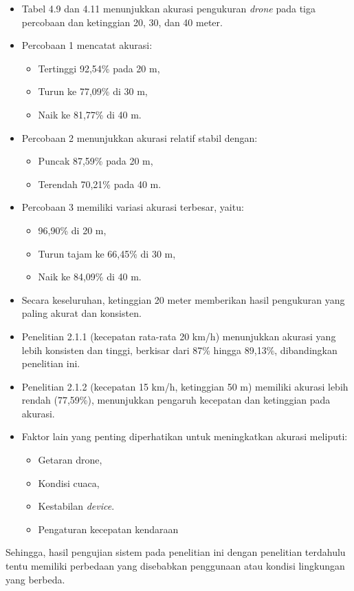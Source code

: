 \begin{itemize}[nolistsep]
    \item Tabel 4.9 dan 4.11 menunjukkan akurasi pengukuran \emph{drone} pada tiga percobaan dan ketinggian 20, 30, dan 40 meter.
    \item Percobaan 1 mencatat akurasi:
    \begin{itemize}[nolistsep]
        \item Tertinggi 92,54\% pada 20 m,
        \item Turun ke 77,09\% di 30 m,
        \item Naik ke 81,77\% di 40 m.
    \end{itemize}
    \item Percobaan 2 menunjukkan akurasi relatif stabil dengan:
    \begin{itemize}[nolistsep]
        \item Puncak 87,59\% pada 20 m,
        \item Terendah 70,21\% pada 40 m.
    \end{itemize}
    \item Percobaan 3 memiliki variasi akurasi terbesar, yaitu:
    \begin{itemize}[nolistsep]
        \item 96,90\% di 20 m,
        \item Turun tajam ke 66,45\% di 30 m,
        \item Naik ke 84,09\% di 40 m.
    \end{itemize}
    \item Secara keseluruhan, ketinggian 20 meter memberikan hasil pengukuran yang paling akurat dan konsisten.
    \item Penelitian 2.1.1 (kecepatan rata-rata 20 km/h) menunjukkan akurasi yang lebih konsisten dan tinggi, berkisar dari 87\% hingga 89,13\%, dibandingkan penelitian ini.
    \item Penelitian 2.1.2 (kecepatan 15 km/h, ketinggian 50 m) memiliki akurasi lebih rendah (77,59\%), menunjukkan pengaruh kecepatan dan ketinggian pada akurasi.
    \item Faktor lain yang penting diperhatikan untuk meningkatkan akurasi meliputi:
    \begin{itemize}[nolistsep]
        \item Getaran drone,
        \item Kondisi cuaca,
        \item Kestabilan \emph{device}.
        \item Pengaturan kecepatan kendaraan
    \end{itemize}
\end{itemize}
Sehingga, hasil pengujian sistem pada penelitian ini dengan penelitian terdahulu tentu memiliki perbedaan yang disebabkan penggunaan atau kondisi lingkungan yang berbeda.

